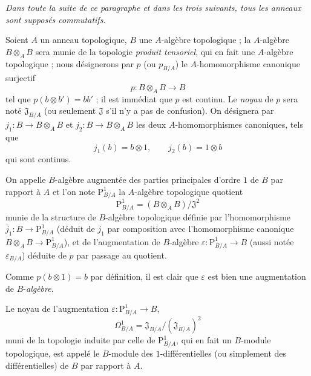 \textit{Dans toute la suite de ce paragraphe et dans les trois suivants, tous les
anneaux sont supposés commutatifs.}

\begin{env}[20.4.1]
\label{0.20.4.1-fr}
Soient $A$ un anneau topologique, $B$ une $A$-algèbre topologique ; la
$A$-algèbre $B\otimes_A B$ sera munie de la topologie \emph{produit
tensoriel}, qui en fait une $A$-algèbre topologique ; nous désignerons par $p$
(ou $p_{B/A}$) le $A$-homomorphisme canonique surjectif
\begin{equation}
\tag{20.4.1.1}
\label{0.20.4.1.1-fr}
  p:B\otimes_A B\to B
\end{equation}
tel que $p(b\otimes b')=bb'$ ; il est immédiat que $p$ est continu. Le
\emph{noyau} de $p$ sera noté $\mathfrak{J}_{B/A}$ (ou seulement
$\mathfrak{J}$ s'il n'y a pas de confusion). On désignera par
$j_1:B\to B\otimes_A B$ et $j_2:B\to B\otimes_A B$ les deux
$A$-homomorphismes canoniques, tels que
\[
  j_1(b)=b\otimes1, \qquad j_2(b)=1\otimes b
\]
qui sont continus.
\end{env}

\begin{definition}[20.4.2]
\label{0.20.4.2-fr}
On appelle $B$-algèbre augmentée des parties principales d'ordre $1$ de
$B$ par rapport à $A$ et l'on note $\mathrm{P}^1_{B/A}$ la $A$-algèbre
topologique quotient
\begin{equation}
\tag{20.4.2.1}
\label{0.20.4.2.1-fr}
  \mathrm{P}^1_{B/A}=(B\otimes_A B)/\mathfrak{J}^2
\end{equation}
munie de la structure de $B$-algèbre topologique définie par l'homomorphisme
$\bar{j}_1:B\to\mathrm{P}^1_{B/A}$ (déduit de $j_1$ par composition avec
l'homomorphisme canonique $B\otimes_A B\to\mathrm{P}^1_{B/A}$), et de
l'augmentation de $B$-algèbre $\varepsilon:\mathrm{P}^1_{B/A}\to B$ (aussi
notée $\varepsilon_{B/A}$) déduite de $p$ par passage au quotient.
\end{definition}

Comme $p(b\otimes1)=b$ par définition, il est clair que $\varepsilon$ est
bien une augmentation de $B$-\emph{algèbre}.

\begin{definition}[20.4.3]
\label{0.20.4.3-fr}
Le noyau de l'augmentation $\varepsilon:\mathrm{P}^1_{B/A}\to B$,
\begin{equation}
\tag{20.4.3.1}
\label{0.20.4.3.1-fr}
  \Omega^1_{B/A}=\mathfrak{J}_{B/A}/(\mathfrak{J}_{B/A})^2
\end{equation}
muni de la topologie induite par celle de $\mathrm{P}^1_{B/A}$, qui en fait
un $B$-module topologique, est appelé le $B$-module des
$1$-différentielles \textup{(ou simplement des} différentielles) de $B$
par rapport à $A$.
\end{definition}

